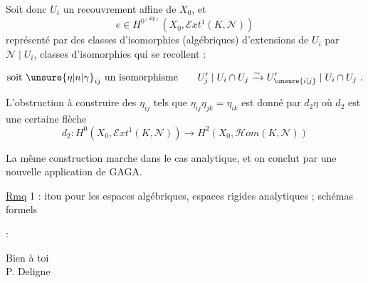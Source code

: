 \noindent Soit donc \(U_i\) un recouvrement affine de \(X_0\), et
\[
 e\in H^{0^{(\mathrm{alg})}}(X_0,\mathscr{E}xt^1(K,\mathscr{N}))
\]
représenté par des classes d'isomorphies (algébriques) d'extensions  de \(U_i\) par \(\mathscr{N}\mid U_i\), classes d'isomorphies qui se recollent :

\[
 \text{soit }\unsure{\eta|n|\gamma}_{ij}\text{ un isomorphisme}\qquad
 U'_j\mid U_i\cap U_j
 \xrightarrow{\sim}
 U'_{\unsure{i|j}}\mid U_i\cap U_j\ .
\]

L'obstruction à construire des \(\eta_{ij}\) tels que \(\eta_{ij}\eta_{jk}=\eta_{ik}\) est donné par \(d_2\eta\) où \(d_2\) est une certaine flèche
\[
 d_2:H^0(X_0,\mathscr{E}xt^1(K,\mathscr{N}))\longrightarrow
 H^2(X_0,\mathscr{H}om(K,\mathscr{N}))
\]

La même construction marche dans le cas analytique, et on conclut par une nouvelle application de GAGA.

\uline{Rmq} 1 : itou pour les espaces algébriques, espaces rigides analytiques ; schémas formels

 :

\noindent\hfill Bien à toi\\
\null\hfill P. Deligne
